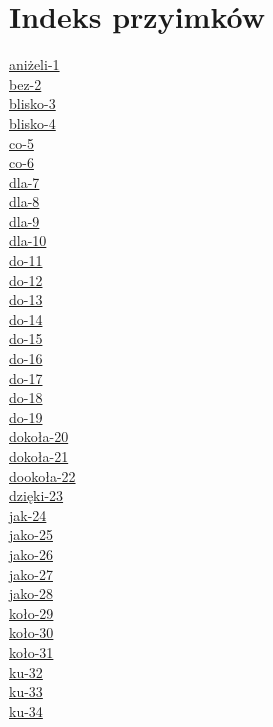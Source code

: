 \documentclass[a4paper, 12pt]{article}
\theoremstyle{remark}
\begin{document}
\section{Indeks przyimków} %
\label{sec:indeks_przyimkow}
\begin{multicols}{4}
\noindent
\hyperref[prep-1]{aniżeli-1}\\
\hyperref[prep-2]{bez-2}\\
\hyperref[prep-3]{blisko-3}\\
\hyperref[prep-4]{blisko-4}\\
\hyperref[prep-5]{co-5}\\
\hyperref[prep-6]{co-6}\\
\hyperref[prep-7]{dla-7}\\
\hyperref[prep-8]{dla-8}\\
\hyperref[prep-9]{dla-9}\\
\hyperref[prep-10]{dla-10}\\
\hyperref[prep-11]{do-11}\\
\hyperref[prep-12]{do-12}\\
\hyperref[prep-13]{do-13}\\
\hyperref[prep-14]{do-14}\\
\hyperref[prep-15]{do-15}\\
\hyperref[prep-16]{do-16}\\
\hyperref[prep-17]{do-17}\\
\hyperref[prep-18]{do-18}\\
\hyperref[prep-19]{do-19}\\
\hyperref[prep-20]{dokoła-20}\\
\hyperref[prep-21]{dokoła-21}\\
\hyperref[prep-21]{dookoła-22}\\
\hyperref[prep-23]{dzięki-23}\\
\hyperref[prep-24]{jak-24}\\
\hyperref[prep-25]{jako-25}\\
\hyperref[prep-26]{jako-26}\\
\hyperref[prep-27]{jako-27}\\
\hyperref[prep-28]{jako-28}\\
\hyperref[prep-29]{koło-29}\\
\hyperref[prep-30]{koło-30}\\
\hyperref[prep-31]{koło-31}\\
\hyperref[prep-32]{ku-32}\\
\hyperref[prep-33]{ku-33}\\
\hyperref[prep-34]{ku-34}\\

\end{multicols}
\end{document}

